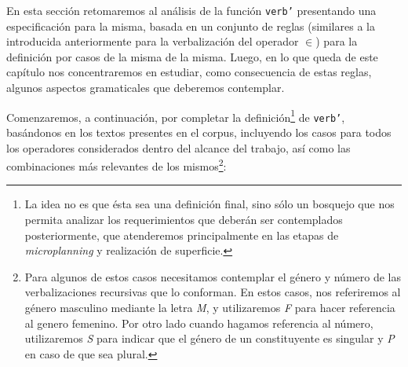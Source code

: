 En esta sección retomaremos al análisis de la función \texttt{verb'} presentando una especificación para la misma, basada en un conjunto de reglas (similares a la introducida anteriormente para la verbalización del operador $\in$) para la definición por casos de la misma de la misma. Luego, en lo que queda de este capítulo nos concentraremos en estudiar, como consecuencia de estas reglas, algunos aspectos gramaticales que deberemos contemplar.

Comenzaremos, a continuación, por completar la definición\footnote{La idea no es que ésta sea una definición final, sino sólo un bosquejo que nos permita analizar los requerimientos que deberán ser contemplados posteriormente, que atenderemos principalmente en las etapas de \textit{microplanning} y realización de superficie.} de \texttt{verb'}, basándonos en los textos presentes en el corpus, incluyendo los casos para todos los operadores considerados dentro del alcance del trabajo, así como las combinaciones más relevantes de los mismos\footnote{Para algunos de estos casos necesitamos contemplar el género y número de las verbalizaciones recursivas que lo conforman. En estos casos, nos referiremos al género masculino mediante la letra \emph{M}, y utilizaremos \emph{F} para hacer referencia al genero femenino. Por otro lado cuando hagamos referencia al número, utilizaremos \emph{S} para indicar que el género de un constituyente es singular y \emph{P} en caso de que sea plural.}:

